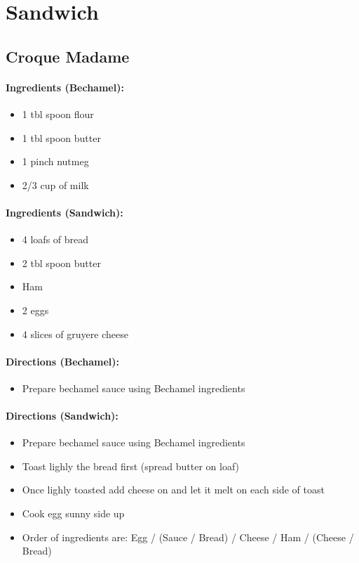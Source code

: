 \documentclass{article}
\begin{document}
\section{Sandwich}


\subsection{Croque Madame} 

\paragraph{Ingredients (Bechamel):}
\begin{itemize}
    \item 1 tbl spoon flour
    \item 1 tbl spoon butter
    \item 1 pinch nutmeg
    \item 2/3 cup of milk
\end{itemize}  

\paragraph{Ingredients (Sandwich):}
\begin{itemize}
    \item 4 loafs of bread
    \item 2 tbl spoon butter
    \item Ham
    \item 2 eggs
    \item 4 slices of gruyere cheese
\end{itemize}  

\paragraph{Directions (Bechamel):}
\begin{itemize}
    \item Prepare bechamel sauce using Bechamel ingredients
\end{itemize}  

\paragraph{Directions (Sandwich):}
\begin{itemize}
    \item Prepare bechamel sauce using Bechamel ingredients
    \item Toast lighly the bread first (spread butter on loaf)
    \item Once lighly toasted add cheese on and let it melt on each side of toast
    \item Cook egg sunny side up
    \item Order of ingredients are: Egg / (Sauce / Bread) / Cheese / Ham / (Cheese / Bread)
\end{itemize} 
\end{document}
